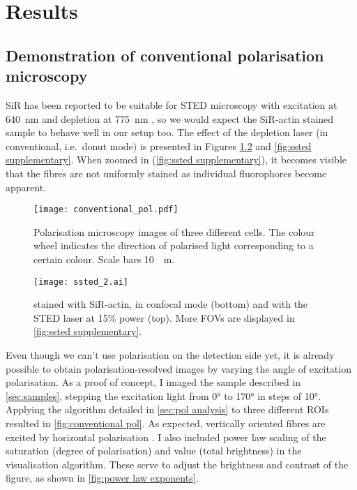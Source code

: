 \chapter{Results}

\section{Demonstration of conventional polarisation microscopy}
\label{sec:conventional pol}

SiR has been reported to be suitable for STED microscopy with excitation at 640~nm and depletion at 775~nm \cite{DEste2015}, so we would expect the SiR-actin stained sample to behave well in our setup too. The effect of the depletion laser (in conventional, i.e.~donut mode) is presented in Figures \ref{fig:ssted} and \ref{fig:ssted supplementary}. When zoomed in (\autoref{fig:ssted supplementary}), it becomes visible that the fibres are not uniformly stained as individual fluorophores become apparent.

\begin{figure}
	\centering
	\texttt{[image: conventional\_pol.pdf]}
	\caption{
		Polarisation microscopy images of three different cells. The colour wheel indicates the direction of polarised light corresponding to a certain colour. Scale bars \SI{10}{\mu m}. 
	}
	\label{fig:conventional pol}
\end{figure}

\begin{figure}
	\centering
	\texttt{[image: ssted\_2.ai]}
	\caption{
	 stained with SiR-actin, in confocal mode (bottom) and with the STED laser at 15\% power (top). More FOVs are displayed in \autoref{fig:ssted supplementary}. 
	}
	\label{fig:ssted}
\end{figure}

Even though we can't use polarisation on the detection side yet, it is already possible to obtain polarisation-resolved images by varying the angle of excitation polarisation. As a proof of concept, I imaged the sample described in \autoref{sec:samples}, stepping the excitation light from \ang{0} to \ang{170} in steps of \ang{10}. Applying the algorithm detailed in \autoref{sec:pol analysis} to three different ROIs resulted in \autoref{fig:conventional pol}. As expected, vertically oriented fibres are excited by horizontal polarisation \cite{Spira2017}.
I also included power law scaling of the saturation (degree of polarisation) and value (total brightness) in the visualisation algorithm. These serve to adjust the brightness and contrast of the figure, as shown in \autoref{fig:power law exponents}.

